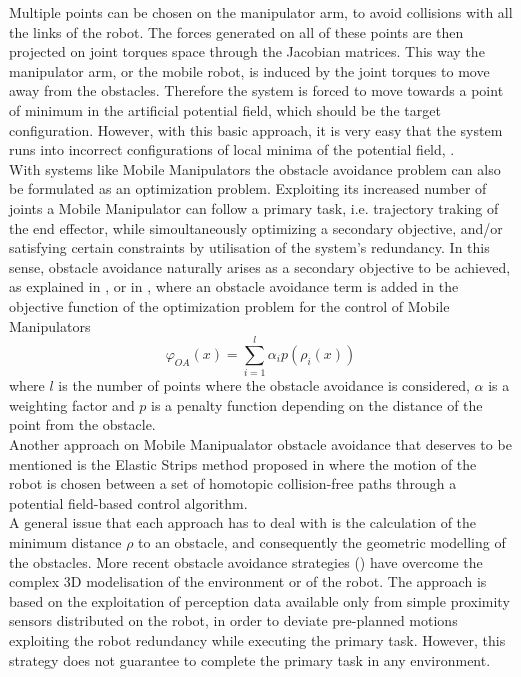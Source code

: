 Multiple points can be chosen on the manipulator arm, to avoid collisions with all the links of the robot. The forces generated on all of these points are then projected on joint torques space through the Jacobian matrices. This way the manipulator arm, or the mobile robot, is induced by the joint torques to move away from the obstacles. Therefore the system is forced to move towards a point of minimum in the artificial potential field, which should be the target configuration. However, with this basic approach, it is very easy that the system runs into incorrect configurations of local minima of the potential field, .\\
With systems like Mobile Manipulators the obstacle avoidance problem can also be formulated as an optimization problem. Exploiting its increased number of joints a Mobile Manipulator can follow a primary task, i.e. trajectory traking of the end effector, while simoultaneously optimizing a secondary objective, and/or satisfying certain constraints by utilisation of the system's redundancy. In this sense, obstacle avoidance naturally arises as a secondary objective to be achieved, as explained in \cite{yamamoto2},\cite{tanner2000} or in \cite{perdereau2002}, where an obstacle avoidance term is added in the objective function of the optimization problem for the control of Mobile Manipulators
\begin{equation}
	\varphi_{OA}(x)=\sum_{i=1}^{l}\alpha_ip(\rho_i(x))
\end{equation}
where $l$ is the number of points where the obstacle avoidance is considered, $\alpha$ is a weighting factor and $p$ is a penalty function depending on the distance of the point from the obstacle.\\
Another approach on Mobile Manipualator obstacle avoidance that deserves to be mentioned is the Elastic Strips method proposed in \cite{brockKhatib} where the motion of the robot is chosen between a set of homotopic collision-free paths through a potential field-based control algorithm. \\
A general issue that each approach has to deal with is the calculation of the minimum distance $\rho$ to an obstacle, and consequently the geometric modelling of the obstacles. More recent obstacle avoidance strategies (\cite{falconatale}) have overcome the complex 3D modelisation of the environment or of the robot. The approach is based on the exploitation of perception data available only from simple proximity sensors distributed on the robot, in order to deviate pre-planned motions exploiting the robot redundancy while executing the primary task. However, this strategy does not guarantee to complete the primary task in any environment.


